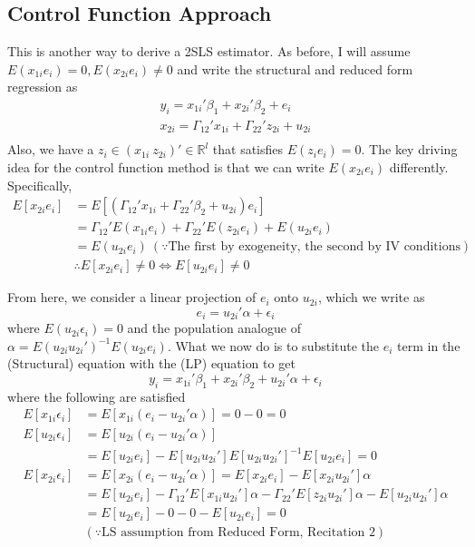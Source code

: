 \documentclass[12pt]{article}
\theoremstyle{definition}
\theoremstyle{property}
\theoremstyle{assumption}
\theoremstyle{example}
\theoremstyle{comment}
\begin{document}
\subsection{Control Function Approach}
This is another way to derive a 2SLS estimator. As before, I will assume $E(x_{1i}e_i)=0, E(x_{2i}e_i)\neq0$ and write the structural and reduced form regression as
\begin{gather*}
y_i = x_{1i}'\beta_1 + x_{2i}'\beta_2+e_i \tag{Structural}\\
x_{2i}=\Gamma_{12}'x_{1i}+\Gamma_{22}'z_{2i}+u_{2i} \tag{Reduced Form}\\
\end{gather*}
Also, we have a $z_i\in( x_{1i}\  z_{2i})'\in\mathbb{R}^l$ that satisfies $E(z_ie_i)=0$. The key driving idea for the control function method is that we can write $E(x_{2i}e_i)$ differently. Specifically, 
\[
\begin{aligned}
E[x_{2i}e_i]&= E[(\Gamma_{12}'x_{1i}+\Gamma_{22}'\beta_2+u_{2i})e_i]\\
&= \Gamma_{12}'E(x_{1i}e_i)+\Gamma_{22}'E(z_{2i}e_i)+E(u_{2i}e_i)\\
&= E(u_{2i}e_i) \ (\because \text{The first by exogeneity, the second by IV conditions})\\
&\therefore E[x_{2i}e_i]\neq 0 \iff E[u_{2i}e_i]\neq 0 
\end{aligned}
\]\par
From here, we consider a linear projection of $e_i$ onto $u_{2i}$, which we write as
\[
e_i  = u_{2i}'\alpha+\epsilon_i \tag{LP}
\]
where $E(u_{2i}\epsilon_i)=0$ and the population analogue of $\alpha=E(u_{2i}u_{2i}')^{-1}E(u_{2i}e_i)$. What we now do is to substitute the $e_i$ term in the (Structural) equation with the (LP) equation to get
\[
y_i = x_{1i}'\beta_1 + x_{2i}'\beta_2+ u_{2i}'\alpha+\epsilon_i   \tag{CFA}
\]
where the following are satisfied
\[
\begin{aligned}
E[x_{1i}\epsilon_i]&=E[x_{1i}(e_i-u_{2i}'\alpha)]=0-0=0 \\
E[u_{2i}\epsilon_i]&=E[u_{2i}(e_i-u_{2i}'\alpha)]\\
&=E[u_{2i}e_i]-E[u_{2i}u_{2i}']E[u_{2i}u_{2i}']^{-1}E[u_{2i}e_i]=0 \\
E[x_{2i}\epsilon_i]&=E[x_{2i}(e_i-u_{2i}'\alpha)]=E[x_{2i}e_i]-E[x_{2i}u_{2i}']\alpha \\
&=E[u_{2i}e_i]-\Gamma_{12}'E[x_{1i}u_{2i}']\alpha-\Gamma_{22}'E[z_{2i}u_{2i}']\alpha-E[u_{2i}u_{2i}']\alpha\\
&=E[u_{2i}e_i]-0-0-E[u_{2i}e_i]=0 \\
&(\because\text{LS assumption from Reduced Form, Recitation 2})\\
\end{aligned}
\]
\end{document}
